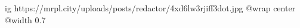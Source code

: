  
 
 
 
 

\ifcmt
  ig https://mrpl.city/uploads/posts/redactor/4xd6lw3rjiff3dot.jpg
  @wrap center
  @width 0.7
\fi
